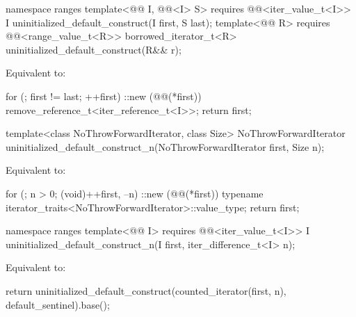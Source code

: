 %
\begin{itemdecl}
namespace ranges {
  template<@@ I, @@<I> S>
    requires @@<iter_value_t<I>>
    I uninitialized_default_construct(I first, S last);
  template<@@ R>
    requires @@<range_value_t<R>>
    borrowed_iterator_t<R> uninitialized_default_construct(R&& r);
}
\end{itemdecl}

\begin{itemdescr}
\pnum
\effects
Equivalent to:
\begin{codeblock}
for (; first != last; ++first)
  ::new (@@(*first)) remove_reference_t<iter_reference_t<I>>;
return first;
\end{codeblock}
\end{itemdescr}

%
\begin{itemdecl}
template<class NoThrowForwardIterator, class Size>
  NoThrowForwardIterator uninitialized_default_construct_n(NoThrowForwardIterator first, Size n);
\end{itemdecl}

\begin{itemdescr}
\pnum
\effects
Equivalent to:
\begin{codeblock}
for (; n > 0; (void)++first, --n)
  ::new (@@(*first))
    typename iterator_traits<NoThrowForwardIterator>::value_type;
return first;
\end{codeblock}
\end{itemdescr}

%
\begin{itemdecl}
namespace ranges {
  template<@@ I>
    requires @@<iter_value_t<I>>
    I uninitialized_default_construct_n(I first, iter_difference_t<I> n);
}
\end{itemdecl}

\begin{itemdescr}
\pnum
\effects
Equivalent to:
\begin{codeblock}
return uninitialized_default_construct(counted_iterator(first, n),
                                       default_sentinel).base();
\end{codeblock}
\end{itemdescr}

